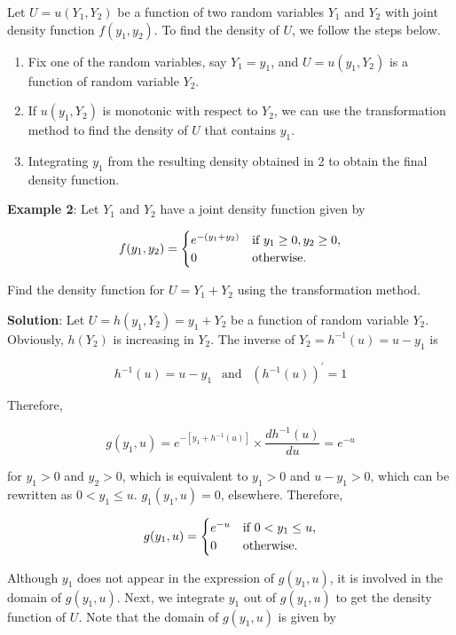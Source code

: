 \documentclass[
]{book}
\begin{document}
Let \(U = u(Y_1, Y_2)\) be a function of two random variables \(Y_1\) and \(Y_2\) with joint density function \(f(y_1, y_2)\). To find the density of \(U\), we follow the steps below.

\begin{enumerate}
\def\labelenumi{\arabic{enumi}.}
\item
  Fix one of the random variables, say \(Y_1 = y_1\), and \(U = u(y_1, Y_2)\) is a function of random variable \(Y_2\).
\item
  If \(u(y_1, Y_2)\) is monotonic with respect to \(Y_2\), we can use the transformation method to find the density of \(U\) that contains \(y_1\).
\item
  Integrating \(y_1\) from the resulting density obtained in 2 to obtain the final density function.
\end{enumerate}

\hfill\break

\textbf{\color{red} Example 2}: Let \(Y_1\) and \(Y_2\) have a joint density function given by

\[
\displaystyle f(y_1, y_2) = \begin{cases} 
 e^{-(y_1+y_2)} & \text{if $ y_1 \ge 0, y_2 \ge 0$}, \\  
 0 & \text{otherwise}.
 \end{cases}
\]

Find the density function for \(U = Y_1 + Y_2\) using the transformation method.

\textbf{Solution}: Let \(U=h(y_1, Y_2) = y_1 + Y_2\) be a function of random variable \(Y_2\). Obviously, \(h(Y_2)\) is increasing in \(Y_2\). The inverse of \(Y_2 = h^{-1}(u) = u - y_1\) is

\[
h^{-1}(u) = u-y_1  \ \ \text{ and } \ \ \left( h^{-1}(u)\right)^\prime = 1
\]

Therefore,

\[
g(y_1,u) = e^{-[y_1 + h^{-1}(u)]}\times \frac{dh^{-1}(u)}{du} = e^{-u}
\]

for \(y_1>0\) and \(y_2 >0\), which is equivalent to \(y_1 > 0\) and \(u-y_1 >0\), which can be rewritten as \(0 <y_1 \le u\). \(g_1(y_1,u) = 0\), elsewhere. Therefore,

\[
\displaystyle g(y_1, u) = \begin{cases} 
 e^{-u} & \text{if $ 0< y_1 \le u$}, \\  
 0 & \text{otherwise}.
 \end{cases}
\]

Although \(y_1\) does not appear in the expression of \(g(y_1,u)\), it is involved in the domain of \(g(y_1,u)\). Next, we integrate \(y_1\) out of \(g(y_1,u)\) to get the density function of \(U\). Note that the domain of \(g(y_1,u)\) is given by
\end{document}
